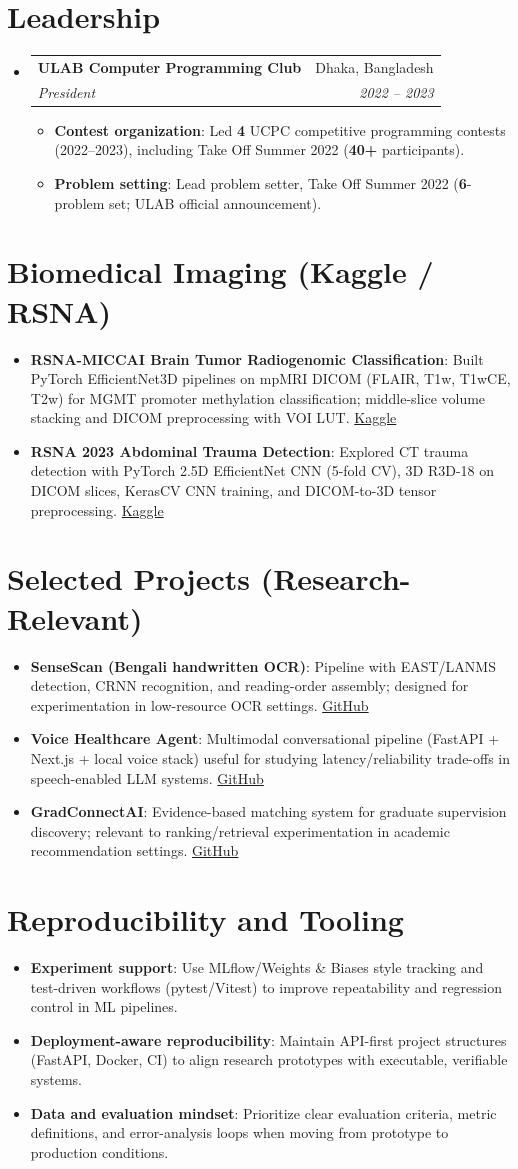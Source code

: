 \documentclass[a4paper,11pt]{article}
\makeatletter
\newcommand{\cvItem}[2]{
  \item\small{
    \textbf{#1}{: #2 \vspace{-2pt}}
  }
}
\newcommand{\cvSubheading}[4]{
  \vspace{-1pt}\item
    \begin{tabular*}{0.97\textwidth}{l@{\extracolsep{\fill}}r}
      \textbf{#1} & #2 \\
      \textit{#3} & \textit{#4} \\
    \end{tabular*}\vspace{-5pt}
}
\newcommand{\cvListStart}{\begin{itemize}[leftmargin=*]}
\newcommand{\cvListEnd}{\end{itemize}}
\newcommand{\cvItemListStart}{\begin{itemize}[itemsep=2pt,parsep=0pt,topsep=3pt,leftmargin=14pt]}
\newcommand{\cvItemListEnd}{\end{itemize}\vspace{-4pt}}
\makeatother
\begin{document}
\section{Leadership}
\cvListStart
\cvSubheading{ULAB Computer Programming Club}{Dhaka, Bangladesh}
{President}{2022 -- 2023}
\cvItemListStart
  \cvItem{Contest organization}{Led \textbf{4} UCPC competitive programming contests (2022--2023), including Take Off Summer 2022 (\textbf{40+} participants).}
  \cvItem{Problem setting}{Lead problem setter, Take Off Summer 2022 (\textbf{6}-problem set; ULAB official announcement).}
\cvItemListEnd
\cvListEnd

\section{Biomedical Imaging (Kaggle / RSNA)}
\cvListStart
\cvItem{RSNA-MICCAI Brain Tumor Radiogenomic Classification}{Built PyTorch EfficientNet3D pipelines on mpMRI DICOM (FLAIR, T1w, T1wCE, T2w) for MGMT promoter methylation classification; middle-slice volume stacking and DICOM preprocessing with VOI LUT. \href{https://www.kaggle.com/code/mutasimbillahnoman/torch-efficientnet3d-for-mri-no-train}{Kaggle}}
\cvItem{RSNA 2023 Abdominal Trauma Detection}{Explored CT trauma detection with PyTorch 2.5D EfficientNet CNN (5-fold CV), 3D R3D-18 on DICOM slices, KerasCV CNN training, and DICOM-to-3D tensor preprocessing. \href{https://www.kaggle.com/code/mutasimbillahnoman/rsna-2-5d-cnn-training-pytorch}{Kaggle}}
\cvListEnd

\section{Selected Projects (Research-Relevant)}
\cvListStart
\cvItem{SenseScan (Bengali handwritten OCR)}{Pipeline with EAST/LANMS detection, CRNN recognition, and reading-order assembly; designed for experimentation in low-resource OCR settings. \href{https://github.com/noman024/SenseScan}{GitHub}}
\cvItem{Voice Healthcare Agent}{Multimodal conversational pipeline (FastAPI + Next.js + local voice stack) useful for studying latency/reliability trade-offs in speech-enabled LLM systems. \href{https://github.com/noman024/healthcare-voice-ai-agent}{GitHub}}
\cvItem{GradConnectAI}{Evidence-based matching system for graduate supervision discovery; relevant to ranking/retrieval experimentation in academic recommendation settings. \href{https://github.com/noman024/gradconnectai}{GitHub}}
\cvListEnd

\section{Reproducibility and Tooling}
\cvListStart
\cvItem{Experiment support}{Use MLflow/Weights \& Biases style tracking and test-driven workflows (pytest/Vitest) to improve repeatability and regression control in ML pipelines.}
\cvItem{Deployment-aware reproducibility}{Maintain API-first project structures (FastAPI, Docker, CI) to align research prototypes with executable, verifiable systems.}
\cvItem{Data and evaluation mindset}{Prioritize clear evaluation criteria, metric definitions, and error-analysis loops when moving from prototype to production conditions.}
\cvListEnd
\end{document}
